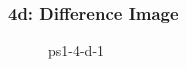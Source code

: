 \documentclass[../report.tex]{subfiles}
\begin{document}
    \begin{frame}
        \frametitle{4d: Difference Image}
        \begin{figure}[!htb]
            \centering
            \caption{ps1-4-d-1}
        \end{figure}
    \end{frame}
    
\end{document}
